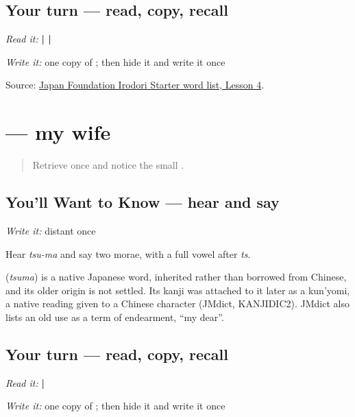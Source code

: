 \subsection*{Your turn — read, copy, recall}
\emph{Read it:} \textbf{ |  | }

\emph{Write it:} one copy of \textbf{}; then hide it and write it once

\begin{tcolorbox}[breakable,colback=teal!4,colframe=teal!35!black,title={Before you move on}]
Source: \href{https://www.irodori.jpf.go.jp/assets/data/wordlist\_X.pdf}{Japan Foundation Irodori Starter word list, Lesson 4}.
\end{tcolorbox}
\section[\texorpdfstring{\ja{つま} (tsuma)}{つま (tsuma)}]{ — my wife}

\label{lesson:JA-C13-tsuma}



\begin{quote}
Retrieve \textbf{} once and notice the small \textbf{}.
\end{quote}

\subsection*{You'll Want to Know — hear and say}
\emph{Write it:} distant \textbf{} once

Hear \emph{tsu-ma} and say two morae, with a full vowel after \emph{ts}.

\begin{cousinweb}
\textbf{} (\emph{tsuma}) is a native Japanese word, inherited rather than borrowed from Chinese, and its older origin is not settled. Its kanji was attached to it later as a kun'yomi, a native reading given to a Chinese character (JMdict, KANJIDIC2). JMdict also lists an old use as a term of endearment, \textquotedblleft{}my dear\textquotedblright{}.
\end{cousinweb}

\subsection*{Your turn — read, copy, recall}
\emph{Read it:} \textbf{ | }

\emph{Write it:} one copy of \textbf{}; then hide it and write it once

